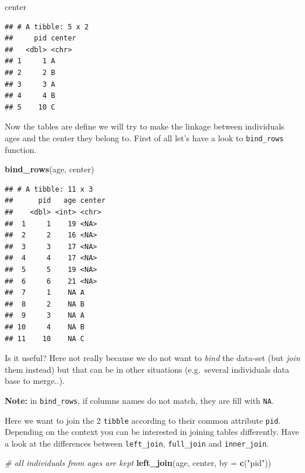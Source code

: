 \documentclass[
]{book}
\newenvironment{Shaded}{\begin{snugshade}}{\end{snugshade}}
\newcommand{\AttributeTok}[1]{\textcolor[rgb]{0.13,0.29,0.53}{#1}}
\newcommand{\CommentTok}[1]{\textcolor[rgb]{0.56,0.35,0.01}{\textit{#1}}}
\newcommand{\FunctionTok}[1]{\textcolor[rgb]{0.13,0.29,0.53}{\textbf{#1}}}
\newcommand{\NormalTok}[1]{#1}
\newcommand{\StringTok}[1]{\textcolor[rgb]{0.31,0.60,0.02}{#1}}
\begin{document}
\begin{Shaded}
\begin{Highlighting}[]
\NormalTok{center}
\end{Highlighting}
\end{Shaded}

\begin{verbatim}
## # A tibble: 5 x 2
##     pid center
##   <dbl> <chr> 
## 1     1 A     
## 2     2 B     
## 3     3 A     
## 4     4 B     
## 5    10 C
\end{verbatim}

Now the tables are define we will try to make the linkage between individuals ages and the center
they belong to.
First of all let's have a look to \texttt{bind\_rows} function.

\begin{Shaded}
\begin{Highlighting}[]
\FunctionTok{bind\_rows}\NormalTok{(age, center)}
\end{Highlighting}
\end{Shaded}

\begin{verbatim}
## # A tibble: 11 x 3
##      pid   age center
##    <dbl> <int> <chr> 
##  1     1    19 <NA>  
##  2     2    16 <NA>  
##  3     3    17 <NA>  
##  4     4    17 <NA>  
##  5     5    19 <NA>  
##  6     6    21 <NA>  
##  7     1    NA A     
##  8     2    NA B     
##  9     3    NA A     
## 10     4    NA B     
## 11    10    NA C
\end{verbatim}

Is it useful?
Here not really because we do not want to \emph{bind} the data-set (but \emph{join} them instead) but that can be in other situations (e.g.~several individuals data base to merge..).

\textbf{Note:} in \texttt{bind\_rows}, if columns names do not match, they are fill with \texttt{NA}.

Here we want to join the 2 \texttt{tibble} according to their common attribute \texttt{pid}. Depending
on the context you can be interested in joining tables differently. Have a look at the differences
between \texttt{left\_join}, \texttt{full\_join} and \texttt{inner\_join}.

\begin{Shaded}
\begin{Highlighting}[]
\CommentTok{\# all individuals from ages are kept}
\FunctionTok{left\_join}\NormalTok{(age, center, }\AttributeTok{by =} \FunctionTok{c}\NormalTok{(}\StringTok{"pid"}\NormalTok{))}
\end{Highlighting}
\end{Shaded}
\end{document}
